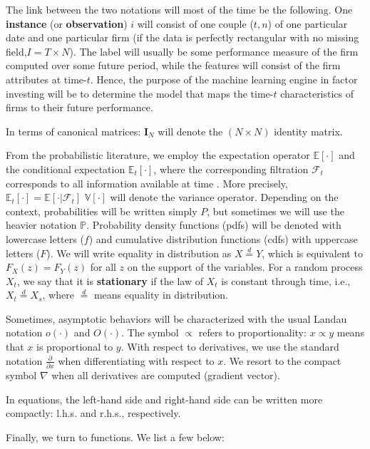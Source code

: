The link between the two notations will most of the time be the following. One \textbf{instance} (or \textbf{observation}) $i$ will consist of one couple ($t,n$) of one particular date and one particular firm (if the data is perfectly rectangular with no missing field,$I=T\times N$). The label will usually be some performance measure of the firm computed over some future period, while the features will consist of the firm attributes at time-$t$. Hence, the purpose of the machine learning engine in factor investing will be to determine the model that maps the time-$t$ characteristics of firms to their future performance.

In terms of canonical matrices: $\mathbf{I}_N$ will denote the $(N\times N)$ identity matrix.

From the probabilistic literature, we employ the expectation operator $\mathbb{E}[\cdot]$ and the conditional expectation $\mathbb{E}_t[\cdot]$, where the corresponding filtration $\mathcal{F}_t$ corresponds to all information available at time . More precisely, $\mathbb{E}_t[\cdot]=\mathbb{E}[\cdot | \mathcal{F}_t]$ $\mathbb{V}[\cdot]$ will denote the variance operator. Depending on the context, probabilities will be written simply $P$, but sometimes we will use the heavier notation $\mathbb{P}$. Probability density functions (pdfs) will be denoted with lowercase letters ($f$) and cumulative distribution functions (cdfs) with uppercase letters ($F$). We will write equality in distribution as $X \overset{d}{=}Y$, which is equivalent to $F_X(z)=F_Y(z)$ for all $z$ on the support of the variables. For a random process $X_t$, we say that it is \textbf{stationary} if the law of $X_t$ is constant through time, i.e., $X_t\overset{d}{=}X_s$, where $\overset{d}{=}$ means equality in distribution.

Sometimes, asymptotic behaviors will be characterized with the usual Landau notation $o(\cdot)$ and $O(\cdot)$. The symbol $\propto$ refers to proportionality: $x\propto y$ means that $x$ is proportional to $y$. With respect to derivatives, we use the standard notation $\frac{\partial}{\partial x}$ when differentiating with respect to $x$. We resort to the compact symbol $\nabla$ when all derivatives are computed (gradient vector).

In equations, the left-hand side and right-hand side can be written more compactly: l.h.s. and r.h.s., respectively.

Finally, we turn to functions. We list a few below:

